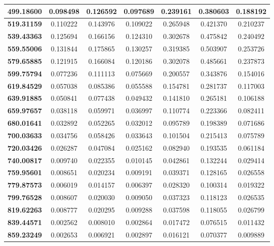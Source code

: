 \documentclass[10pt, a4paper]{article}
\begin{document}
\begin{table}[htbp]
\begin{center}
\begin{tabular}{|c|c|c|c|c|c|c|}
		\textbf{499.18600} & 0.098498 & 0.126592 & 0.097689 & 0.239161 & 0.380603 & 0.188192 \\ \hline
		\textbf{519.31159} & 0.110222 & 0.143976 & 0.109022 & 0.265948 & 0.421370 & 0.210237 \\ \hline
		\textbf{539.43363} & 0.125694 & 0.166156 & 0.124310 & 0.302678 & 0.475842 & 0.240492 \\ \hline
		\textbf{559.55006} & 0.131844 & 0.175865 & 0.130257 & 0.319385 & 0.503907 & 0.253726 \\ \hline
		\textbf{579.65885} & 0.121915 & 0.166084 & 0.120186 & 0.302078 & 0.485661 & 0.237873 \\ \hline
		\textbf{599.75794} & 0.077236 & 0.111113 & 0.075669 & 0.200557 & 0.343876 & 0.154016 \\ \hline
		\textbf{619.84529} & 0.057038 & 0.085386 & 0.055588 & 0.154781 & 0.281737 & 0.117003 \\ \hline
		\textbf{639.91885} & 0.050841 & 0.077438 & 0.049432 & 0.141810 & 0.265181 & 0.106188 \\ \hline
		\textbf{659.97657} & 0.038118 & 0.059971 & 0.036997 & 0.110774 & 0.223366 & 0.082411 \\ \hline
		\textbf{680.01641} & 0.032892 & 0.052265 & 0.032012 & 0.095789 & 0.198389 & 0.071686 \\ \hline
		\textbf{700.03633} & 0.034756 & 0.058426 & 0.033643 & 0.101504 & 0.215413 & 0.075789 \\ \hline
		\textbf{720.03426} & 0.026287 & 0.047084 & 0.025162 & 0.082940 & 0.193535 & 0.061184 \\ \hline
		\textbf{740.00817} & 0.009740 & 0.022355 & 0.010145 & 0.042861 & 0.132244 & 0.029414 \\ \hline
		\textbf{759.95601} & 0.008651 & 0.020234 & 0.009191 & 0.039371 & 0.128165 & 0.026558 \\ \hline
		\textbf{779.87573} & 0.006019 & 0.014157 & 0.006397 & 0.028320 & 0.100314 & 0.019322 \\ \hline
		\textbf{799.76528} & 0.008607 & 0.020030 & 0.009050 & 0.037323 & 0.118123 & 0.026535 \\ \hline
		\textbf{819.62263} & 0.008777 & 0.020295 & 0.009288 & 0.037598 & 0.118055 & 0.026799 \\ \hline
		\textbf{839.44571} & 0.002562 & 0.008010 & 0.002864 & 0.017472 & 0.076515 & 0.011432 \\ \hline
		\textbf{859.23249} & 0.002653 & 0.006921 & 0.002897 & 0.016121 & 0.070377 & 0.009889 \\ \hline

\end{tabular}
\end{center}
\end{table}
\end{document}
